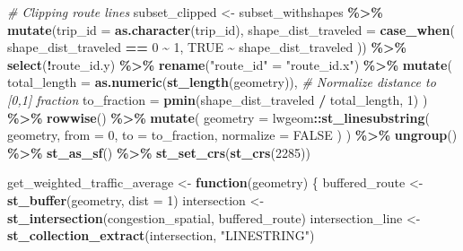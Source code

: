 \documentclass[
  12pt,
]{article}
\newenvironment{Shaded}{\begin{snugshade}}{\end{snugshade}}
\newcommand{\AttributeTok}[1]{\textcolor[rgb]{0.13,0.29,0.53}{#1}}
\newcommand{\CommentTok}[1]{\textcolor[rgb]{0.56,0.35,0.01}{\textit{#1}}}
\newcommand{\ConstantTok}[1]{\textcolor[rgb]{0.56,0.35,0.01}{#1}}
\newcommand{\ControlFlowTok}[1]{\textcolor[rgb]{0.13,0.29,0.53}{\textbf{#1}}}
\newcommand{\DecValTok}[1]{\textcolor[rgb]{0.00,0.00,0.81}{#1}}
\newcommand{\FunctionTok}[1]{\textcolor[rgb]{0.13,0.29,0.53}{\textbf{#1}}}
\newcommand{\NormalTok}[1]{#1}
\newcommand{\OtherTok}[1]{\textcolor[rgb]{0.56,0.35,0.01}{#1}}
\newcommand{\SpecialCharTok}[1]{\textcolor[rgb]{0.81,0.36,0.00}{\textbf{#1}}}
\newcommand{\StringTok}[1]{\textcolor[rgb]{0.31,0.60,0.02}{#1}}
\begin{document}
\begin{Shaded}
\begin{Highlighting}[]
\CommentTok{\# Clipping route lines}
\NormalTok{subset\_clipped }\OtherTok{\textless{}{-}}\NormalTok{ subset\_withshapes }\SpecialCharTok{\%\textgreater{}\%}
  \FunctionTok{mutate}\NormalTok{(}\AttributeTok{trip\_id =} \FunctionTok{as.character}\NormalTok{(trip\_id),}
         \AttributeTok{shape\_dist\_traveled =} \FunctionTok{case\_when}\NormalTok{(}
\NormalTok{           shape\_dist\_traveled }\SpecialCharTok{==} \DecValTok{0} \SpecialCharTok{\textasciitilde{}} \DecValTok{1}\NormalTok{,}
           \ConstantTok{TRUE} \SpecialCharTok{\textasciitilde{}}\NormalTok{ shape\_dist\_traveled}
\NormalTok{         )) }\SpecialCharTok{\%\textgreater{}\%}
  \FunctionTok{select}\NormalTok{(}\SpecialCharTok{!}\NormalTok{route\_id.y) }\SpecialCharTok{\%\textgreater{}\%}
  \FunctionTok{rename}\NormalTok{(}\StringTok{"route\_id"} \OtherTok{=} \StringTok{"route\_id.x"}\NormalTok{) }\SpecialCharTok{\%\textgreater{}\%}
  \FunctionTok{mutate}\NormalTok{(}
    \AttributeTok{total\_length =} \FunctionTok{as.numeric}\NormalTok{(}\FunctionTok{st\_length}\NormalTok{(geometry)),}
    \CommentTok{\# Normalize distance to [0,1] fraction}
    \AttributeTok{to\_fraction =} \FunctionTok{pmin}\NormalTok{(shape\_dist\_traveled }\SpecialCharTok{/}\NormalTok{ total\_length, }\DecValTok{1}\NormalTok{)}
\NormalTok{  ) }\SpecialCharTok{\%\textgreater{}\%}
  \FunctionTok{rowwise}\NormalTok{() }\SpecialCharTok{\%\textgreater{}\%} 
  \FunctionTok{mutate}\NormalTok{(}
    \AttributeTok{geometry =}\NormalTok{ lwgeom}\SpecialCharTok{::}\FunctionTok{st\_linesubstring}\NormalTok{(}
\NormalTok{      geometry,}
      \AttributeTok{from =} \DecValTok{0}\NormalTok{,}
      \AttributeTok{to =}\NormalTok{ to\_fraction,}
      \AttributeTok{normalize =} \ConstantTok{FALSE}
\NormalTok{    )}
\NormalTok{  ) }\SpecialCharTok{\%\textgreater{}\%}
  \FunctionTok{ungroup}\NormalTok{() }\SpecialCharTok{\%\textgreater{}\%}
  \FunctionTok{st\_as\_sf}\NormalTok{() }\SpecialCharTok{\%\textgreater{}\%}
  \FunctionTok{st\_set\_crs}\NormalTok{(}\FunctionTok{st\_crs}\NormalTok{(}\DecValTok{2285}\NormalTok{))}

\NormalTok{get\_weighted\_traffic\_average }\OtherTok{\textless{}{-}} \ControlFlowTok{function}\NormalTok{(geometry) \{}
\NormalTok{  buffered\_route }\OtherTok{\textless{}{-}} \FunctionTok{st\_buffer}\NormalTok{(geometry, }\AttributeTok{dist =} \DecValTok{1}\NormalTok{)}
\NormalTok{  intersection }\OtherTok{\textless{}{-}} \FunctionTok{st\_intersection}\NormalTok{(congestion\_spatial, buffered\_route)}
\NormalTok{  intersection\_line }\OtherTok{\textless{}{-}} \FunctionTok{st\_collection\_extract}\NormalTok{(intersection, }\StringTok{"LINESTRING"}\NormalTok{)}
  

\end{Highlighting}
\end{Shaded}
\end{document}
